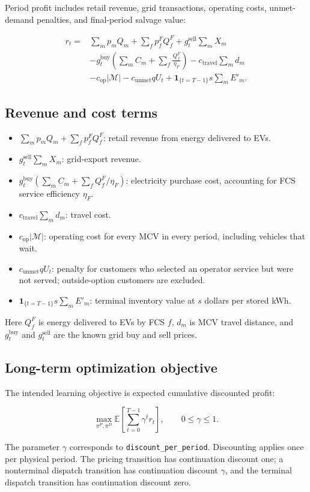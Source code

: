 \documentclass[11pt,letterpaper]{article}
\begin{document}
Period profit includes retail revenue, grid transactions, operating costs, unmet-demand penalties, and final-period salvage value:

\[
\begin{aligned}
r_t={}&
\sum_m p_m Q_m+\sum_f p^F_f Q^F_f
+g_t^{\mathrm{sell}}\sum_m X_m\\
&-g_t^{\mathrm{buy}}
\left(\sum_m C_m+\sum_f\frac{Q^F_f}{\eta_F}\right)
-c_{\mathrm{travel}}\sum_m d_m\\
&-c_{\mathrm{op}}|\mathcal{M}|
-c_{\mathrm{unmet}}qU_t
+\mathbf{1}_{\{t=T-1\}}s\sum_m E'_m.
\end{aligned}
\]


\subsection*{Revenue and cost terms}


\begin{itemize}
\setlength{\itemsep}{1pt}
\item $\sum_m p_mQ_m+\sum_f p^F_fQ^F_f$: retail revenue from energy delivered to EVs.
\item $g_t^{\mathrm{sell}}\sum_mX_m$: grid-export revenue.
\item $g_t^{\mathrm{buy}}(\sum_mC_m+\sum_fQ^F_f/\eta_F)$: electricity purchase cost, accounting for FCS service efficiency $\eta_F$.
\item $c_{\mathrm{travel}}\sum_md_m$: travel cost.
\item $c_{\mathrm{op}}|\mathcal{M}|$: operating cost for every MCV in every period, including vehicles that wait.
\item $c_{\mathrm{unmet}}qU_t$: penalty for customers who selected an operator service but were not served; outside-option customers are excluded.
\item $\mathbf{1}_{\{t=T-1\}}s\sum_mE'_m$: terminal inventory value at $s$ dollars per stored kWh.
\end{itemize}


Here $Q^F_f$ is energy delivered to EVs by FCS $f$, $d_m$ is MCV travel distance, and $g_t^{\mathrm{buy}}$ and $g_t^{\mathrm{sell}}$ are the known grid buy and sell prices.

\subsection*{Long-term optimization objective}


The intended learning objective is expected cumulative discounted profit:

\[
\max_{\pi^P,\pi^D}
\mathbb{E}\left[
\sum_{t=0}^{T-1}\gamma^t r_t
\right],
\qquad 0\leq\gamma\leq1.
\]


The parameter $\gamma$ corresponds to \texttt{discount\_per\_period}. Discounting applies once per physical period. The pricing transition has continuation discount one; a nonterminal dispatch transition has continuation discount $\gamma$, and the terminal dispatch transition has continuation discount zero.
\end{document}
